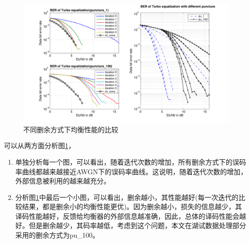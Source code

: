 \begin{figure}[htb]
  \begin{center}
    \includegraphics[width=\textwidth]{images/different_puncture_separate.pdf}
  \end{center}
  \caption{不同删余方式下均衡性能的比较}
  \label{fig:3.6}
\end{figure}
可以从两方面分析图\ref{fig:3.6}，
\begin{enumerate}
    \item
        单独分析每一个图，可以看出，随着迭代次数的增加，所有删余方式下的误码率曲线都越来越接近AWGN下的误码率曲线。这说明，随着迭代次数的增加，外部信息被利用的越来越充分。
    \item
        分析图\ref{fig:3.6}中最后一个小图，可以看出，删余越小，其性能越好(每一次迭代的比较结果，都是删余小的均衡性能更优)。因为删余越小，损失的信息越少，其译码性能越好，反馈给均衡器的外部信息越准确，因此，总体的译码性能会越好。但是删余越少，其码率越低，考虑到这个问题，本文在湖试数据处理部分采用的删余方式为pu\_100。
\end{enumerate}

